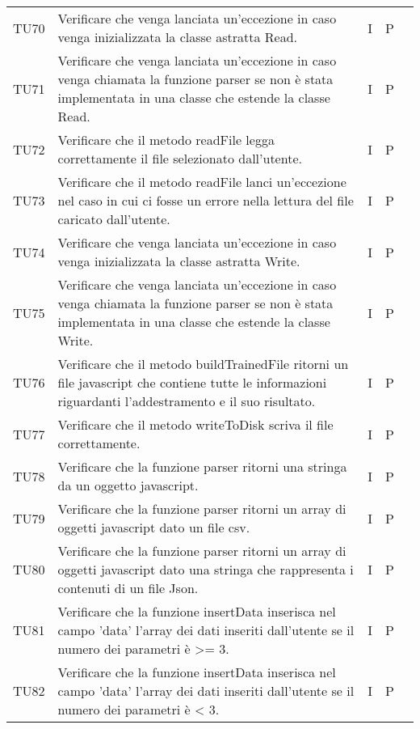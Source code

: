 \begin{longtable} {
		>{}p{15mm} 
		>{}p{79.5mm}
		>{}p{15mm} 
		>{}p{15mm}
		>{}p{0mm}}
	TU70		& Verificare che venga lanciata un'eccezione in caso venga inizializzata la classe astratta  Read.& I & P &\TBstrut \\ [2mm]
	TU71		& Verificare che venga lanciata un'eccezione in caso venga chiamata la funzione parser se non è stata implementata in una classe che estende la classe Read.& I & P &\TBstrut \\ [2mm]
	TU72		& Verificare che il metodo readFile legga correttamente il file selezionato dall'utente.& I & P &\TBstrut \\ [2mm]
	TU73		& Verificare che il metodo readFile lanci un'eccezione nel caso in cui ci fosse un errore nella lettura del file caricato dall'utente.& I & P &\TBstrut \\ [2mm]
	TU74		& Verificare che venga lanciata un'eccezione in caso venga inizializzata la classe astratta  Write.& I & P &\TBstrut \\ [2mm]
	TU75		& Verificare che venga lanciata un'eccezione in caso venga chiamata la funzione parser se non è stata implementata in una classe che estende la classe Write.& I & P &\TBstrut \\ [2mm]
	TU76		& Verificare che il metodo buildTrainedFile ritorni un file javascript che contiene tutte le informazioni riguardanti l'addestramento e il suo risultato.& I & P &\TBstrut \\ [2mm]
	TU77		& Verificare che il metodo writeToDisk scriva il file correttamente.& I & P &\TBstrut \\ [2mm]
	TU78		& Verificare che la funzione parser ritorni una stringa da un oggetto javascript.& I & P &\TBstrut \\ [2mm]
	TU79		& Verificare che la funzione parser ritorni un array di oggetti javascript dato un file csv.& I & P &\TBstrut \\ [2mm]
	TU80		& Verificare che la funzione parser ritorni un array di oggetti javascript dato una stringa che rappresenta i contenuti di un file Json.& I & P &\TBstrut \\ [2mm]
	TU81		& Verificare che la funzione insertData inserisca nel campo 'data' l'array dei dati inseriti dall'utente se il numero dei parametri è >= 3.& I & P &\TBstrut \\ [2mm]
	TU82		& Verificare che la funzione insertData inserisca nel campo 'data' l'array dei dati inseriti dall'utente se il numero dei parametri è < 3.& I & P &\TBstrut \\ [2mm]

\end{longtable}
